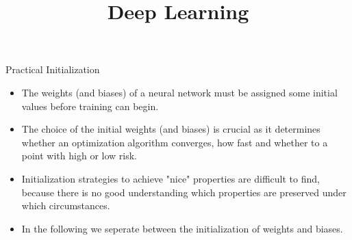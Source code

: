 




\newcommand{\titlefigure}{figure/spiral_planar_data/he_intro.png}
\newcommand{\learninggoals}{
  \item 
  \item 
  \item 
}

\title{Deep Learning}
\date{}




\begin{vbframe} {Practical Initialization}
  \begin{itemize}
    \item The weights (and biases) of a neural network must be assigned some initial values before training can begin.
    \item The choice of the initial weights (and biases) is crucial as it determines whether an optimization algorithm converges, how fast and whether to a point with high or low risk. 
    \item Initialization strategies to achieve "nice" properties are difficult to find, because there is no good understanding which properties are preserved under which circumstances. 
    \item In the following we seperate between the initialization of weights and biases. 
  \end{itemize}
  \end{vbframe}
  
